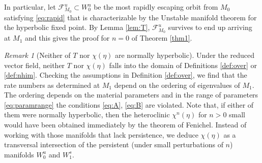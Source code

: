 \documentclass[a4paper,11pt]{article}
\newtheorem{lemma}{Lemma}[section]
\theoremstyle{remark}
\newtheorem{remark}{Remark}[section]
\begin{document}
In particular, let $\mathcal{F}^u_{M_0}\subset W^u_0$ be the most rapidly escaping orbit from $M_0$ satisfying \eqref{eq:rapid} that is characterizable by the Unstable manifold theorem for the hyperbolic fixed point. By Lemma \ref{lem:T}, $\mathcal{F}^u_{M_0}$ survives to end up arriving at $M_1$ and this gives the proof for $n=0$ of Theorem \ref{thm1}.

\begin{remark}[Neither of $T$ nor $\chi(\eta)$ are normally hyperbolic]
Under the reduced vector field, neither $T$ nor $\chi(\eta)$ falls into the domain of Definitions \ref{def:over} or \ref{def:nhim}. Checking the assumptions 
in Definition \ref{def:over}, we find that the rate numbers as determined at $M_1$ depend on the ordering of eigenvalues of $M_1$. 
The ordering depends on the material parameters and in the range of parameters \eqref{eq:paramrange} the conditions \eqref{eq:A}, \eqref{eq:B} are violated.
Note that, if either of them were normally hyperbolic, then the heteroclinic $\chi^n(\eta)$ for $n>0$ small would have been obtained immediately by the theorem of Fenichel. Instead of working with those manifolds that lack persistence, we deduce $\chi(\eta)$ as a transversal intersection of the persistent  (under small 
perturbations of $n$) manifolds $W_0^u$ and $W_1^s$. 
%
%
\end{remark}

% 
% 
\end{document}

